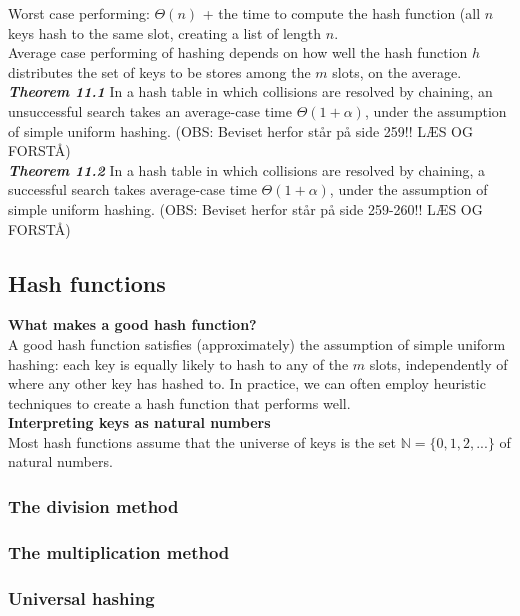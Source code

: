 \documentclass[12pt]{article}
\begin{document}
Worst case performing: $\Theta (n)$ + the time to compute the hash function (all $n$ keys hash to the same slot, creating a list of length $n$. \\

Average case performing of hashing depends on how well the hash function $h$ distributes the set of keys to be stores among the $m$ slots, on the average. \\

\textbf{\textit{Theorem 11.1}}
In a hash table in which collisions are resolved by chaining, an unsuccessful search takes an average-case time $\Theta (1 + \alpha)$, under the assumption of simple uniform hashing. (OBS: Beviset herfor står på side 259!! LÆS OG FORSTÅ)\\

\textbf{\textit{Theorem 11.2}} 
In a hash table in which collisions are resolved by chaining, a successful search takes average-case time $\Theta (1 + \alpha)$, under the assumption of simple uniform hashing. (OBS: Beviset herfor står på side 259-260!! LÆS OG FORSTÅ)

\subsection{Hash functions}
\textbf{What makes a good hash function?} \\
A good hash function satisfies (approximately) the assumption of simple uniform hashing: each key is equally likely to hash to any of the $m$ slots, independently of where any other key has hashed to. In practice, we can often employ heuristic techniques to create a hash function that performs well. \\

\textbf{Interpreting keys as natural numbers}\\
Most hash functions assume that the universe of keys is the set $\mathbb{N} = \{0, 1, 2, ...\}$ of natural numbers. 

\subsubsection{The division method}
\subsubsection{The multiplication method}
\subsubsection{Universal hashing}
\end{document}
